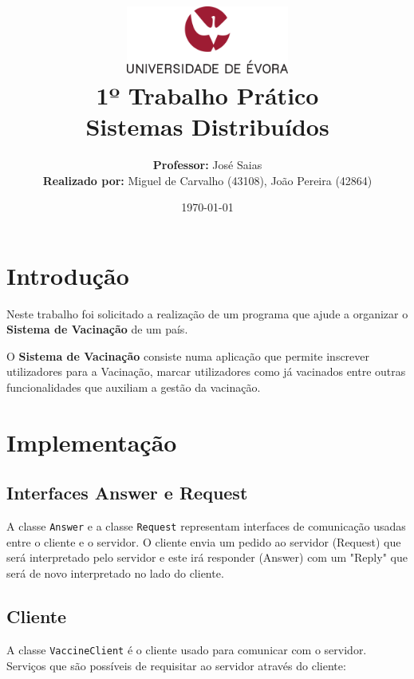 \documentclass[11pt]{article}
\title
{
    \includegraphics[width=0.4\textwidth]{imgs/university.png}
    \\[0.1cm]
    \textbf{1º Trabalho Prático} \\
    Sistemas Distribuídos
}
\author
{
    \textbf{Professor:} José Saias \\
    \textbf{Realizado por:} Miguel de Carvalho (43108), João Pereira (42864) 
}
\date{\today}
\begin{document}
\maketitle

\section{Introdução}

\hspace{0,5cm}Neste trabalho foi solicitado a realização de um programa que ajude a organizar o \textbf{Sistema
de Vacinação} de um país. \par

O \textbf{Sistema de Vacinação} consiste numa aplicação que permite inscrever utilizadores para a Vacinação,
marcar utilizadores como já vacinados entre outras funcionalidades que auxiliam a gestão da vacinação.

\section{Implementação}

\subsection{Interfaces Answer e Request}

\hspace{0,5cm} A classe \verb|Answer| e a classe \verb|Request| representam interfaces de comunicação 
usadas entre o cliente e o servidor. O cliente envia um pedido ao servidor (Request) que será 
interpretado pelo servidor e este irá responder (Answer) com um "Reply" que será de novo interpretado
no lado do cliente.

\subsection{Cliente}

A classe \verb|VaccineClient| é o cliente usado para comunicar com o servidor.
Serviços que são possíveis de requisitar ao servidor através do cliente:
\end{document}
